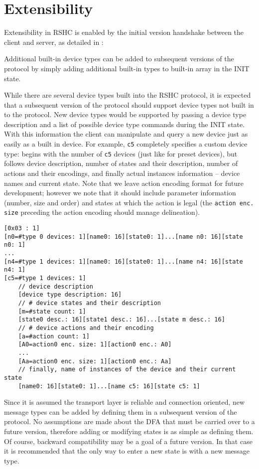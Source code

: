 \section{Extensibility}
\label{sec:extend}

Extensibility in RSHC is enabled by the initial version handshake between the client and server, as detailed in :
\begin{itemize}
\end{itemize}

Additional built-in device types can be added to subsequent versions of the protocol by simply adding additional built-in types to built-in array in the INIT state.

While there are several device types built into the RSHC protocol, it is expected that a subsequent version of the protocol should support device types not built in to the protocol.  New device types would be supported by passing a device type description and a list of possible device type commands during the INIT state.  With this information the client can manipulate and query a new device just as easily as a built in device.  For example, {\tt c5} completely specifies a custom device type: begins with the number of {\tt c5} devices (just like for preset devices), but follows device description, number of states and their description, number of actions and their encodings, and finally actual instances information -- device names and current state. Note that we leave action encoding format for future development; however we note that it should include parameter information (number, size and order) and states at which the action is legal (the {\tt action enc. size} preceding the action encoding should manage delineation).

\begin{verbatim}
[0x03 : 1]
[n0=#type 0 devices: 1][name0: 16][state0: 1]...[name n0: 16][state n0: 1]
...
[n4=#type 1 devices: 1][name0: 16][state0: 1]...[name n4: 16][state n4: 1]
[c5=#type 1 devices: 1]
    // device description
    [device type description: 16]
    // # device states and their description
    [m=#state count: 1]
    [state0 desc.: 16][state1 desc.: 16]...[state m desc.: 16]
    // # device actions and their encoding
    [a=#action count: 1]
    [A0=action0 enc. size: 1][action0 enc.: A0]
    ...
    [Aa=action0 enc. size: 1][action0 enc.: Aa]
    // finally, name of instances of the device and their current state
    [name0: 16][state0: 1]...[name c5: 16][state c5: 1]
\end{verbatim}

Since it is assumed the transport layer is reliable and connection oriented, new message types can be added by defining them in a subsequent version of the protocol.  No assumptions are made about the DFA that must be carried over to a future version, therefore adding or modifying states is as simple as defining them.  Of course, backward compatibility may be a goal of a future version.  In that case it is recommended that the only way to enter a new state is with a new message type.


